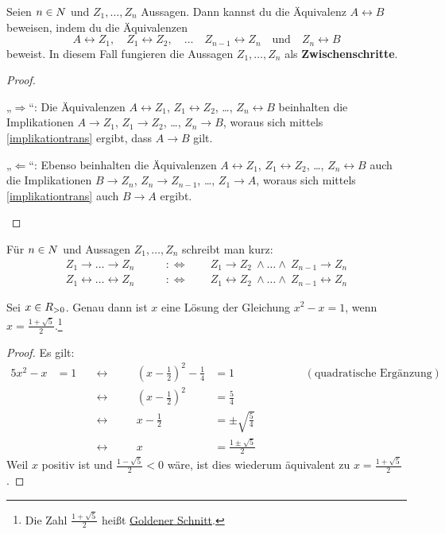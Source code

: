 \begin{satz} \label{ifftrans}
    Seien $n\in\relax N$ und $Z_1,\dots , Z_n$ Aussagen. Dann kannst du die Äquivalenz $A\leftrightarrow B$ beweisen, indem du die Äquivalenzen
        \[ A\leftrightarrow Z_1,\quad Z_1\leftrightarrow Z_2,\quad \dots\quad Z_{n-1}\leftrightarrow Z_n \quad\text{und}\quad Z_n\leftrightarrow B \]
    beweist. In diesem Fall fungieren die Aussagen $Z_1,\dots , Z_n$ als \textbf{Zwischenschritte}.
\end{satz}
\begin{proof}
    \begin{labeling}
        \item[„$\Rightarrow$“:] Die Äquivalenzen $A\leftrightarrow Z_1$, $Z_1\leftrightarrow Z_2$, \dots, $Z_n\leftrightarrow B$ beinhalten die Implikationen $A\to Z_1$, $Z_1\to Z_2$, \dots, $Z_n\to B$, woraus sich mittels \cref{implikationtrans} ergibt, dass $A\to B$ gilt.
        \item[„$\Leftarrow$“:] Ebenso beinhalten die Äquivalenzen $A\leftrightarrow Z_1$, $Z_1\leftrightarrow Z_2$, \dots, $Z_n\leftrightarrow B$ auch die Implikationen $B\to Z_n$, $Z_n\to Z_{n-1}$, \dots, $Z_1\to A$, woraus sich mittels \cref{implikationtrans} auch $B\to A$ ergibt. \qedhere
    \end{labeling}
\end{proof}


\begin{nota}[*] \label{todotsto}
    Für $n\in \relax N$ und Aussagen $Z_1,\dots , Z_n$ schreibt man kurz:
    \begin{align*}
        Z_1\to \ldots \to Z_n \qquad &:\Leftrightarrow\qquad Z_1\to Z_2\ \land \ldots \land\ Z_{n-1}\to Z_n \\
        Z_1\leftrightarrow \ldots \leftrightarrow Z_n \qquad &:\Leftrightarrow\qquad Z_1\leftrightarrow Z_2\ \land \ldots \land\ Z_{n-1}\leftrightarrow Z_n
    \end{align*}
\end{nota}


\begin{bsp}[*]
    Sei $x\in \relax R_{>0}$. Genau dann ist $x$ eine Lösung der Gleichung $x^2-x=1$, wenn $x= \frac{1+\sqrt{5}}{2}$.\footnote{Die Zahl $\frac{1+\sqrt{5}}{2}$ heißt \href{https://de.wikipedia.org/wiki/Goldener_Schnitt}{Goldener Schnitt}.}
\end{bsp}
\begin{proof}
    Es gilt:
    \begin{alignat*}{5}
        x^2-x& =1 \quad&\leftrightarrow\quad&& \left(x-\frac{1}{2}\right)^2 - \frac{1}{4} &= 1 &&& \qquad(\text{quadratische Ergänzung}) \\
        && \leftrightarrow\quad&& \left(x-\frac{1}{2}\right)^2&=\frac{5}{4} \\
        && \leftrightarrow\quad&& x-\frac{1}{2} &= \pm \sqrt{\frac{5}{4}} \\
        && \leftrightarrow\quad&& x  &= \frac{1\pm \sqrt{5}}{2} 
    \end{alignat*}
    Weil $x$ positiv ist und $\frac{1-\sqrt{5}}{2}<0$ wäre, ist dies wiederum äquivalent zu $x=\frac{1+\sqrt{5}}{2}$.
\end{proof}


